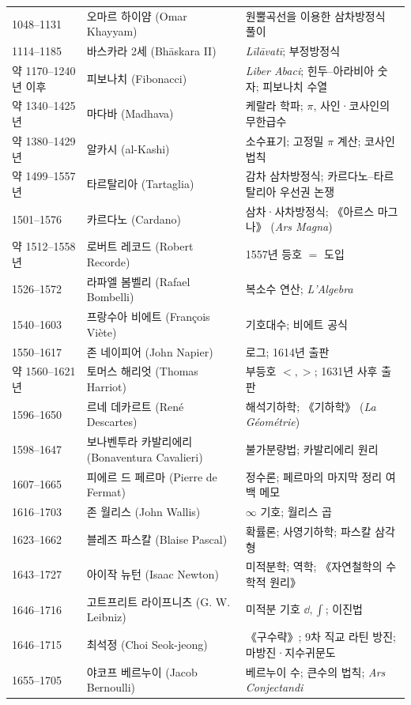 \begin{center}
\begin{longtable}{@{}L{0.16\textwidth}L{0.24\textwidth}L{0.52\textwidth}@{}}
1048--1131 & 오마르 하이얌 (Omar Khayyam) & 원뿔곡선을 이용한 삼차방정식 풀이\\
1114--1185 & 바스카라 2세 (Bhāskara II) & \textit{Līlāvatī}; 부정방정식\\
약 1170--1240년 이후 & 피보나치 (Fibonacci) & \textit{Liber Abaci}; 힌두--아라비아 숫자; 피보나치 수열\\
약 1340--1425년 & 마다바 (Madhava) & 케랄라 학파; $\pi$, 사인·코사인의 무한급수\\
약 1380--1429년 & 알카시 (al-Kashi) & 소수표기; 고정밀 $\pi$ 계산; 코사인 법칙\\
약 1499--1557년 & 타르탈리아 (Tartaglia) & 감차 삼차방정식; 카르다노--타르탈리아 우선권 논쟁\\
1501--1576 & 카르다노 (Cardano) & 삼차·사차방정식; 《아르스 마그나》 (\textit{Ars Magna})\\
약 1512--1558년 & 로버트 레코드 (Robert Recorde) & 1557년 등호 $=$ 도입\\
1526--1572 & 라파엘 봄벨리 (Rafael Bombelli) & 복소수 연산; \textit{L'Algebra}\\
1540--1603 & 프랑수아 비에트 (François Viète) & 기호대수; 비에트 공식\\
1550--1617 & 존 네이피어 (John Napier) & 로그; 1614년 출판\\
약 1560--1621년 & 토머스 해리엇 (Thomas Harriot) & 부등호 $<,>$; 1631년 사후 출판\\
1596--1650 & 르네 데카르트 (René Descartes) & 해석기하학; 《기하학》 (\textit{La Géométrie})\\
1598--1647 & 보나벤투라 카발리에리 (Bonaventura Cavalieri) & 불가분량법; 카발리에리 원리\\
1607--1665 & 피에르 드 페르마 (Pierre de Fermat) & 정수론; 페르마의 마지막 정리 여백 메모\\
1616--1703 & 존 월리스 (John Wallis) & $\infty$ 기호; 월리스 곱\\
1623--1662 & 블레즈 파스칼 (Blaise Pascal) & 확률론; 사영기하학; 파스칼 삼각형\\
1643--1727 & 아이작 뉴턴 (Isaac Newton) & 미적분학; 역학; 《자연철학의 수학적 원리》\\
1646--1716 & 고트프리트 라이프니츠 (G. W. Leibniz) & 미적분 기호 $\dd,\int$; 이진법\\
1646--1715 & 최석정 (Choi Seok-jeong) & 《구수략》; 9차 직교 라틴 방진; 마방진·지수귀문도\\
1655--1705 & 야코프 베르누이 (Jacob Bernoulli) & 베르누이 수; 큰수의 법칙; \textit{Ars Conjectandi}\\

\end{longtable}
\end{center}

